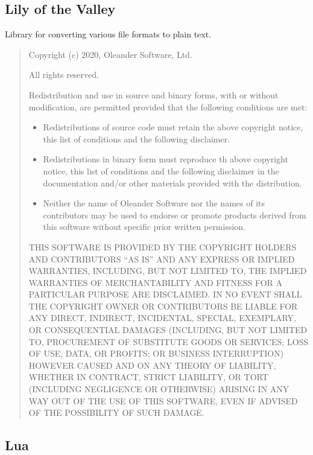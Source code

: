 \documentclass[
]{book}
\theoremstyle{definition}
\theoremstyle{definition}
\theoremstyle{definition}
\theoremstyle{definition}
\theoremstyle{remark}
\begin{document}
\hypertarget{lily-of-the-valley}{%
\subsection*{Lily of the Valley}\label{lily-of-the-valley}}

Library for converting various file formats to plain text.

\begin{quote}
Copyright (c) 2020, Oleander Software, Ltd.

All rights reserved.

Redistribution and use in source and binary forms, with
or without modification, are permitted provided that the
following conditions are met:

\begin{itemize}
\item
  Redistributions of source code must retain the above
  copyright notice, this list of conditions and the
  following disclaimer.
\item
  Redistributions in binary form must reproduce th
  above copyright notice, this list of conditions
  and the following disclaimer in the documentation
  and/or other materials provided with the distribution.
\item
  Neither the name of Oleander Software nor the names
  of its contributors may be used to endorse or promote
  products derived from this software without specific
  prior written permission.
\end{itemize}

THIS SOFTWARE IS PROVIDED BY THE COPYRIGHT HOLDERS AND
CONTRIBUTORS ``AS IS'' AND ANY EXPRESS OR IMPLIED WARRANTIES,
INCLUDING, BUT NOT LIMITED TO, THE IMPLIED WARRANTIES OF
MERCHANTABILITY AND FITNESS FOR A PARTICULAR PURPOSE ARE DISCLAIMED.
IN NO EVENT SHALL THE COPYRIGHT OWNER OR CONTRIBUTORS BE LIABLE
FOR ANY DIRECT, INDIRECT, INCIDENTAL, SPECIAL, EXEMPLARY, OR
CONSEQUENTIAL DAMAGES (INCLUDING, BUT NOT LIMITED TO, PROCUREMENT OF
SUBSTITUTE GOODS OR SERVICES; LOSS OF USE, DATA, OR PROFITS;
OR BUSINESS INTERRUPTION) HOWEVER CAUSED AND ON ANY THEORY OF LIABILITY,
WHETHER IN CONTRACT, STRICT LIABILITY, OR TORT
(INCLUDING NEGLIGENCE OR OTHERWISE) ARISING IN ANY WAY OUT OF THE
USE OF THIS SOFTWARE, EVEN IF ADVISED OF THE POSSIBILITY OF SUCH DAMAGE.
\end{quote}

\hypertarget{lua}{%
\subsection*{Lua}\label{lua}}
\end{document}
